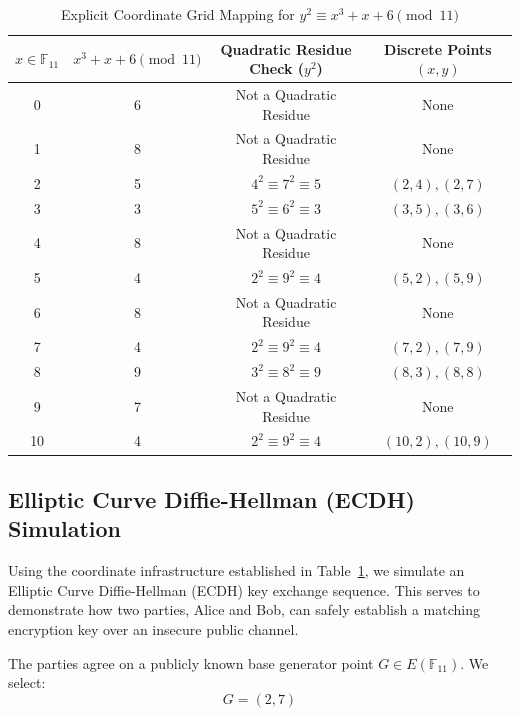 \documentclass[11pt,a4paper]{article}
\begin{document}
\begin{table}[htbp]
    \centering
    \caption{Explicit Coordinate Grid Mapping for $y^2 \equiv x^3 + x + 6 \pmod{11}$}
    \label{tab:coordinate_solutions}
    \begin{tabular}{cccc}
        \toprule
        $x \in \mathbb{F}_{11}$ & $x^3 + x + 6 \pmod{11}$ & Quadratic Residue Check ($y^2$) & Discrete Points $(x,y)$ \\
        \midrule
        0  & 6  & Not a Quadratic Residue   & None \\
        1  & 8  & Not a Quadratic Residue   & None \\
        2  & 5  & $4^2 \equiv 7^2 \equiv 5$ & $(2,4), (2,7)$ \\
        3  & 3  & $5^2 \equiv 6^2 \equiv 3$ & $(3,5), (3,6)$ \\
        4  & 8  & Not a Quadratic Residue   & None \\
        5  & 4  & $2^2 \equiv 9^2 \equiv 4$ & $(5,2), (5,9)$ \\
        6  & 8  & Not a Quadratic Residue   & None \\
        7  & 4  & $2^2 \equiv 9^2 \equiv 4$ & $(7,2), (7,9)$ \\
        8  & 9  & $3^2 \equiv 8^2 \equiv 9$ & $(8,3), (8,8)$ \\
        9  & 7  & Not a Quadratic Residue   & None \\
        10 & 4  & $2^2 \equiv 9^2 \equiv 4$ & $(10,2), (10,9)$ \\
        \bottomrule
    \end{tabular}
\end{table}

\subsection{Elliptic Curve Diffie-Hellman (ECDH) Simulation}
\label{subsec:ecdh_sim}
Using the coordinate infrastructure established in Table~\ref{tab:coordinate_solutions}, we simulate an Elliptic Curve Diffie-Hellman (ECDH) key exchange sequence. This serves to demonstrate how two parties, Alice and Bob, can safely establish a matching encryption key over an insecure public channel.

The parties agree on a publicly known base generator point $G \in E(\mathbb{F}_{11})$. We select:
\begin{equation}
    G = (2, 7)
\end{equation}
\end{document}
